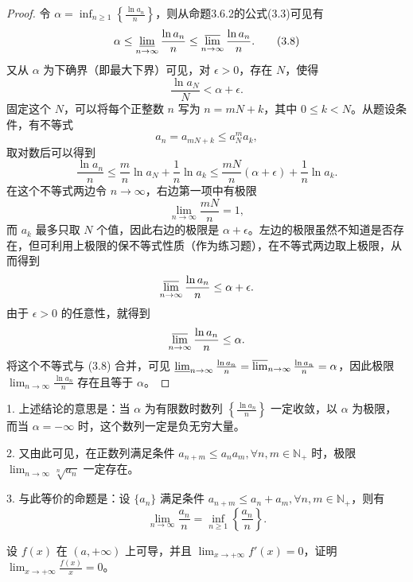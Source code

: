 \documentclass[lang=cn,12pt]{elegantbook}
\begin{document}
\begin{proof}
令 \(\alpha = \inf_{n \geq 1} \left\{ \frac{\ln a_n}{n} \right\}\)，则从命题3.6.2的公式(3.3)可见有
\[
\alpha \leq \varliminf_{n \to \infty} \frac{\ln a_n}{n} \leq \varlimsup_{n \to \infty} \frac{\ln a_n}{n}. \tag{3.8}
\]
又从 \(\alpha\) 为下确界（即最大下界）可见，对 \(\epsilon > 0\)，存在 \(N\)，使得
\[
\frac{\ln a_N}{N} < \alpha + \epsilon.
\]
固定这个 \(N\)，可以将每个正整数 \(n\) 写为 \(n = mN + k\)，其中 \(0 \leq k < N\)。从题设条件，有不等式
\[
a_n = a_{mN+k} \leq a_N^m a_k,
\]
取对数后可以得到
\[
\frac{\ln a_n}{n} \leq \frac{m}{n} \ln a_N + \frac{1}{n} \ln a_k \leq \frac{mN}{n} (\alpha + \epsilon) + \frac{1}{n} \ln a_k.
\]
在这个不等式两边令 \(n \to \infty\)，右边第一项中有极限
\[
\lim_{n \to \infty} \frac{mN}{n} = 1,
\]
而 \(a_k\) 最多只取 \(N\) 个值，因此右边的极限是 \(\alpha + \epsilon\)。左边的极限虽然不知道是否存在，但可利用上极限的保不等式性质（作为练习题），在不等式两边取上极限，从而得到
\[
\varlimsup_{n \to \infty} \frac{\ln a_n}{n} \leq \alpha + \epsilon.
\]
由于 \(\epsilon > 0\) 的任意性，就得到
\[
\varlimsup_{n \to \infty} \frac{\ln a_n}{n} \leq \alpha.
\]
将这个不等式与 (3.8) 合并，可见 \(\varliminf_{n \to \infty} \frac{\ln a_n}{n} = \varlimsup_{n \to \infty} \frac{\ln a_n}{n} = \alpha\)，因此极限 \(\lim_{n \to \infty} \frac{\ln a_n}{n}\) 存在且等于 \(\alpha\)。
\end{proof}

\begin{remark}

1. 上述结论的意思是：当 \(\alpha\) 为有限数时数列 \(\left\{ \frac{\ln a_n}{n} \right\}\) 一定收敛，以 \(\alpha\) 为极限，而当 \(\alpha = -\infty\) 时，这个数列一定是负无穷大量。

2.
又由此可见，在正数列满足条件 \(a_{n+m} \leq a_n a_m, \forall n, m \in \mathbb{N}_+\) 时，极限 \(\lim_{n \to \infty} \sqrt[n]{a_n}\) 一定存在。

3.
与此等价的命题是：设 \(\{a_n\}\) 满足条件 \(a_{n+m} \leq a_n + a_m, \forall n, m \in \mathbb{N}_+\)，则有
\[
\lim_{n \to \infty} \frac{a_n}{n} = \inf_{n \geq 1} \left\{ \frac{a_n}{n} \right\}.
\]
\end{remark}

\begin{example}
设 \( f(x) \) 在 \((a, +\infty)\) 上可导，并且 \(\lim_{x \to +\infty} f'(x) = 0\)，证明 \(\lim_{x \to +\infty} \frac{f(x)}{x} = 0\)。
\end{example}
\end{document}
